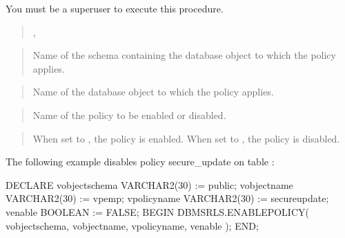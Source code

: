 \documentclass[letterpaper,10pt,english,openany,oneside]{sphinxmanual}
\begin{document}
You must be a superuser to execute this procedure.
\begin{quote}

,

\end{quote}


\begin{quote}

Name of the schema containing the database object to which the policy
applies.
\end{quote}

\begin{quote}

Name of the database object to which the policy applies.
\end{quote}

\begin{quote}

Name of the policy to be enabled or disabled.
\end{quote}

\begin{quote}

When set to , the policy is enabled. When set to , the policy
is disabled.
\end{quote}


The following example disables policy secure\_update on table
:

%
\begin{sphinxVerbatim}[commandchars=\\\{\}]
DECLARE
    v\PYGZus{}object\PYGZus{}schema         VARCHAR2(30) := \PYGZsq{}public\PYGZsq{};
    v\PYGZus{}object\PYGZus{}name           VARCHAR2(30) := \PYGZsq{}vpemp\PYGZsq{};
    v\PYGZus{}policy\PYGZus{}name           VARCHAR2(30) := \PYGZsq{}secure\PYGZus{}update\PYGZsq{};
    v\PYGZus{}enable                BOOLEAN := FALSE;
BEGIN
    DBMS\PYGZus{}RLS.ENABLE\PYGZus{}POLICY(
        v\PYGZus{}object\PYGZus{}schema,
        v\PYGZus{}object\PYGZus{}name,
        v\PYGZus{}policy\PYGZus{}name,
        v\PYGZus{}enable
    );
END;
\end{sphinxVerbatim}
\end{document}

